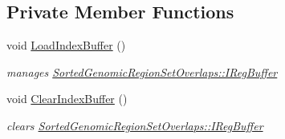 \subsection*{Private Member Functions}
\begin{CompactItemize}
\item 
\hypertarget{classSortedGenomicRegionSetOverlaps_d894d118c61c3cd11be8b37b8f185120}{
void \hyperlink{classSortedGenomicRegionSetOverlaps_d894d118c61c3cd11be8b37b8f185120}{LoadIndexBuffer} ()}
\label{classSortedGenomicRegionSetOverlaps_d894d118c61c3cd11be8b37b8f185120}

\begin{CompactList}\small\item\em manages \hyperlink{classSortedGenomicRegionSetOverlaps_19fa18e6abd9f045786698fff48a445f}{SortedGenomicRegionSetOverlaps::IRegBuffer} \item\end{CompactList}\item 
\hypertarget{classSortedGenomicRegionSetOverlaps_c5fe4552253a9d9d802d76b0f4356947}{
void \hyperlink{classSortedGenomicRegionSetOverlaps_c5fe4552253a9d9d802d76b0f4356947}{ClearIndexBuffer} ()}
\label{classSortedGenomicRegionSetOverlaps_c5fe4552253a9d9d802d76b0f4356947}

\begin{CompactList}\small\item\em clears \hyperlink{classSortedGenomicRegionSetOverlaps_19fa18e6abd9f045786698fff48a445f}{SortedGenomicRegionSetOverlaps::IRegBuffer} \item\end{CompactList}\end{CompactItemize}
